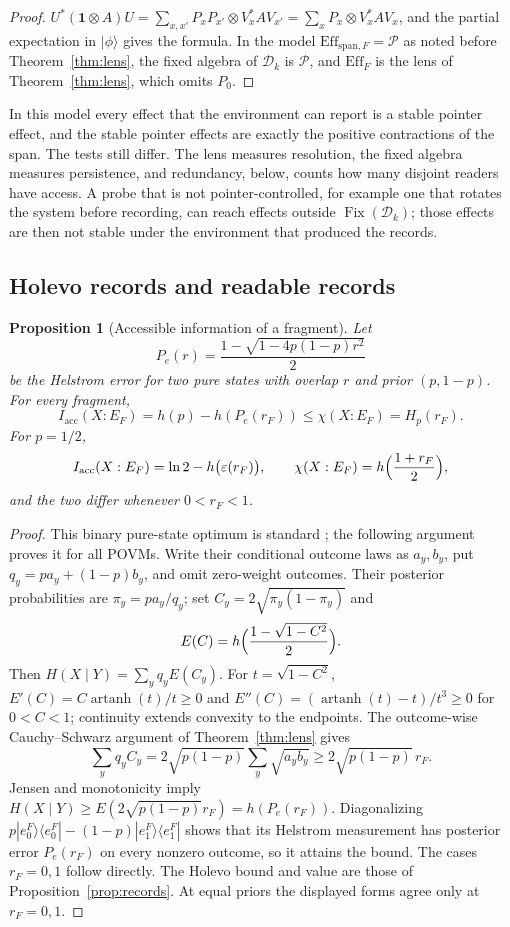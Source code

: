 \documentclass[12pt,a4paper]{article}
\newtheorem{proposition}[theorem]{Proposition}
\begin{document}
\begin{proof}
$U^*(\mathbf 1\otimes A)U=\sum_{x,x'}P_xP_{x'}\otimes V_x^*AV_{x'}=\sum_xP_x\otimes V_x^*AV_x$, and the partial expectation in $|\phi\rangle$ gives the formula. In the model $\mathrm{Eff}_{\mathrm{span},F}=\mathcal P$ as noted before Theorem~\ref{thm:lens}, the fixed algebra of $\mathcal D_k$ is $\mathcal P$, and $\mathrm{Eff}_F$ is the lens of Theorem~\ref{thm:lens}, which omits $P_0$.
\end{proof}

In this model every effect that the environment can report is a stable pointer effect, and the stable pointer effects are exactly the positive contractions of the span. The tests still differ. The lens measures resolution, the fixed algebra measures persistence, and redundancy, below, counts how many disjoint readers have access. A probe that is not pointer-controlled, for example one that rotates the system before recording, can reach effects outside $\operatorname{Fix}(\mathcal D_k)$; those effects are then not stable under the environment that produced the records.

\subsection{Holevo records and readable records}

\begin{proposition}[Accessible information of a fragment]
\label{prop:acc}
Let
\[
P_e(r)=\frac{1-\sqrt{1-4p(1-p)r^2}}{2}
\]
be the Helstrom error for two pure states with overlap $r$ and prior $(p,1-p)$. For every fragment,
\[
I_{\mathrm{acc}}(X:E_F)=h(p)-h(P_e(r_F))\le\chi(X:E_F)=H_p(r_F).
\]
For $p=1/2$,
\[
I_{\mathrm{acc}}(X:E_F)=\ln2-h\bigl(\varepsilon(r_F)\bigr),
\qquad
\chi(X:E_F)=h\Bigl(\frac{1+r_F}2\Bigr),
\]
and the two differ whenever $0<r_F<1$.
\end{proposition}

\begin{proof}
This binary pure-state optimum is standard
\cite[Sec.~3.5.4]{Fuchs1996}; the following argument proves it for all
POVMs. Write their conditional outcome laws as $a_y,b_y$, put
$q_y=pa_y+(1-p)b_y$, and omit zero-weight outcomes. Their posterior
probabilities are $\pi_y=pa_y/q_y$; set
$C_y=2\sqrt{\pi_y(1-\pi_y)}$ and
\[
 E(C)=h\Bigl(\frac{1-\sqrt{1-C^2}}2\Bigr).
\]
Then $H(X\mid Y)=\sum_yq_yE(C_y)$.
For $t=\sqrt{1-C^2}$, $E'(C)=C\operatorname{artanh}(t)/t\ge0$ and
$E''(C)=(\operatorname{artanh}(t)-t)/t^3\ge0$ for $0<C<1$;
continuity extends convexity to the endpoints. The outcome-wise Cauchy--Schwarz argument
of Theorem~\ref{thm:lens} gives
\[
 \sum_yq_yC_y
 =2\sqrt{p(1-p)}\sum_y\sqrt{a_yb_y}
 \ge2\sqrt{p(1-p)}\,r_F.
\]
Jensen and monotonicity imply
$H(X\mid Y)\ge E(2\sqrt{p(1-p)}r_F)=h(P_e(r_F))$.
Diagonalizing $p|e_0^F\rangle\langle e_0^F|-
(1-p)|e_1^F\rangle\langle e_1^F|$ shows that its Helstrom
measurement has posterior error $P_e(r_F)$ on every nonzero outcome,
so it attains the bound. The cases $r_F=0,1$ follow directly.
The Holevo bound and value are those of Proposition~\ref{prop:records}.
At equal priors the displayed forms agree only at $r_F=0,1$.
\end{proof}
\end{document}

